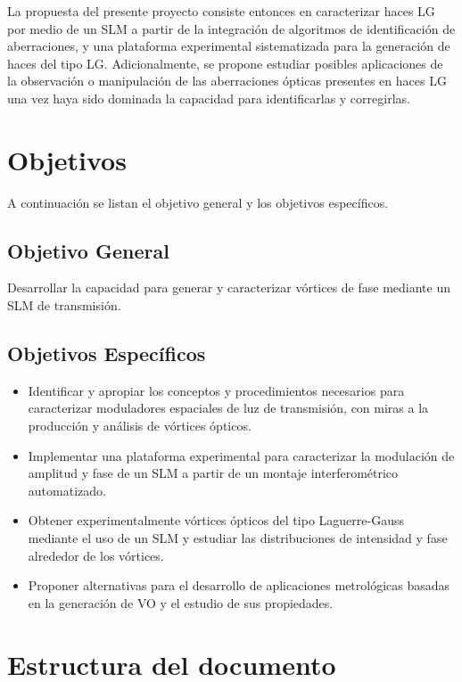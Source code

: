 La propuesta del presente proyecto consiste entonces en caracterizar
haces LG por medio de un SLM a partir de la integración de  
algoritmos de identificación de aberraciones, y una plataforma
experimental sistematizada para la generación de haces del tipo LG.  
Adicionalmente, se propone estudiar posibles aplicaciones de la
observación o manipulación de las aberraciones ópticas presentes en
haces LG una vez haya sido dominada la capacidad para identificarlas y
corregirlas. 


\section{Objetivos}
\label{sec:objetivos}
 A continuación se listan el objetivo general y los
objetivos específicos. 
\subsection{Objetivo General}
Desarrollar la capacidad para generar y caracterizar vórtices de fase
mediante un SLM de transmisión.
\subsection{Objetivos Específicos}
\begin{itemize}
\item Identificar y apropiar los conceptos y procedimientos necesarios
  para caracterizar moduladores espaciales de luz de transmisión, con
  miras a la producción y análisis de vórtices ópticos.
\item Implementar una plataforma experimental para caracterizar la
  modulación de amplitud y fase de un SLM a partir de un montaje
  interferométrico automatizado.
\item Obtener experimentalmente vórtices ópticos del tipo
  Laguerre-Gauss mediante el uso de un SLM y estudiar las
  distribuciones de intensidad y fase alrededor de los vórtices.
\item Proponer alternativas para el desarrollo de aplicaciones
  metrológicas basadas en la generación de VO y el estudio de sus
  propiedades.
\end{itemize}

\section{Estructura del documento\label{sec:estructura}}

